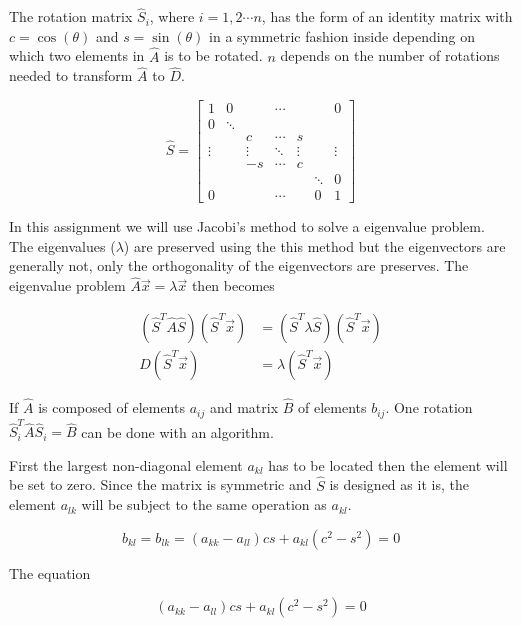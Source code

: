 \documentclass[twoside,twocolumn]{article}
\newcommand{\nl}{
	
	\medskip
	\noindent
}
\begin{document}
	\noindent
	The rotation matrix $\hat{S}_i$, where $i = 1,2\cdots n$, has the form of an identity matrix with $c = \cos(\theta)$ and $s = \sin(\theta)$ in a symmetric fashion inside depending on which two elements in $\hat{A}$ is to be rotated. $n$ depends on the number of rotations needed to transform $\hat{A}$ to $\hat{D}$.   
	
	\begin{equation*}
	\hat{S} = \begin{bmatrix}
	1 & 0 & & \cdots & & & 0 \\
	0 & \ddots &  &  & & & \\
	&  & c & \cdots & s & &\\
	\vdots & & \vdots & \ddots & \vdots & &\vdots\\
	& & -s & \cdots & c & &\\
	& & & & &\ddots & 0\\
	0 & & & \cdots & & 0 & 1
	\end{bmatrix}
	\end{equation*}
	
	\noindent
	In this assignment we will use Jacobi's method to solve a eigenvalue problem. The eigenvalues ($\lambda$) are preserved using the this method but the eigenvectors are generally not, only the orthogonality of the eigenvectors are preserves. The eigenvalue problem $\hat{A}\vec{x} = \lambda\vec{x}$ then becomes 
	
	\begin{align*}
	(\hat{S}^T\hat{A}\hat{S})(\hat{S}^T\vec{x}) &= (\hat{S}^T\lambda\hat{S})(\hat{S}^T\vec{x})\\
	\hat{D}(\hat{S}^T\vec{x}) &= \lambda(\hat{S}^T\vec{x})
	\end{align*}
	
	
	\nl
	If $\hat{A}$ is composed of elements $a_{ij}$ and matrix $\hat{B}$ of elements $b_{ij}$. 
	One rotation $\hat{S}_i^T\hat{A}\hat{S}_i = \hat{B}$ can be done with an algorithm. 
	\nl
	First the largest non-diagonal element $a_{kl}$ has to be located then the element will be set to zero. Since the matrix is symmetric and $\hat{S}$ is designed as it is, the element $a_{lk}$ will be subject to the same operation as $a_{kl}$.
	
	\begin{equation*}
	b_{kl} = b_{lk} = (a_{kk}-a_{ll})cs + a_{kl}(c^2-s^2) = 0
	\end{equation*}
	
	The equation
	
	\begin{equation*}
	(a_{kk}-a_{ll})cs + a_{kl}(c^2-s^2) = 0
	\end{equation*}
	
\end{document}
